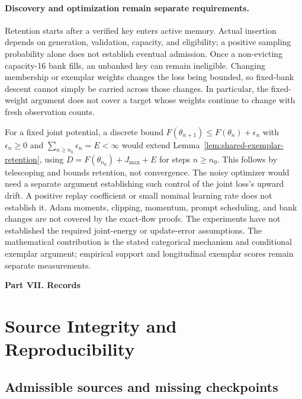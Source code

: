 \documentclass{article}
\newcommand{\1}{\mathbf 1}
\theoremstyle{remark}
\theoremstyle{definition}
\theoremstyle{plain}
\begin{document}
\paragraph{Discovery and optimization remain separate requirements.}
Retention starts after a verified key enters active memory. Actual insertion
depends on generation, validation, capacity, and eligibility; a positive
sampling probability alone does not establish eventual admission. Once a
non-evicting capacity-16 bank fills, an unbanked key can remain ineligible.
Changing membership or exemplar weights changes the loss being bounded, so
fixed-bank descent cannot simply be carried across those changes. In
particular, the fixed-weight argument does not cover a target whose weights
continue to change with fresh observation counts.

For a fixed joint potential, a discrete bound
$F(\theta_{n+1})\le F(\theta_n)+\epsilon_n$ with
$\epsilon_n\ge0$ and $\sum_{n\ge n_0}\epsilon_n=E<\infty$ would extend
Lemma~\ref{lem:shared-exemplar-retention}, using
$D=F(\theta_{n_0})+J_{\max}+E$ for steps $n\ge n_0$.
This follows by telescoping and bounds retention, not convergence. The noisy
optimizer would need a separate argument establishing such control of the
joint loss's upward drift. A positive replay coefficient or small nominal
learning rate does not establish it. Adam moments, clipping, momentum, prompt
scheduling, and bank changes are not covered by the exact-flow proofs.
The experiments have not established the required joint-energy or
update-error assumptions. The mathematical contribution is the stated
categorical mechanism and conditional exemplar argument; empirical support
and longitudinal exemplar scores remain separate measurements.


\clearpage
{}
\begin{center}\large\textbf{Part VII. Records}\end{center}

\section{Source Integrity and Reproducibility}
\label{app:reproducibility}

\subsection{Admissible sources and missing checkpoints}
\label{app:source-integrity}
\end{document}

